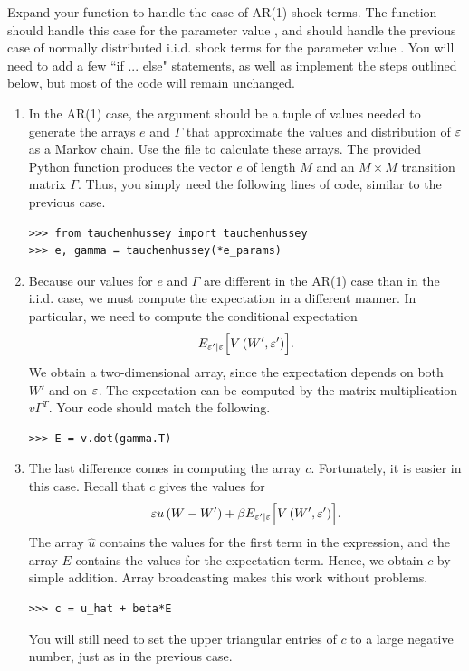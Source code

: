 \begin{problem}
Expand your  function to handle the case of AR(1) shock terms. The function should
handle this case for the parameter value , and should handle the previous case of
normally distributed i.i.d. shock terms for the parameter value . You will need to
add a few ``if ... else" statements, as well as implement the steps outlined below, but most of the
code will remain unchanged.

\begin{enumerate}
\item In the AR(1) case, the  argument should be a tuple of values needed to
generate the arrays $e$ and $\Gamma$ that approximate the values and distribution of $\varepsilon$
as a Markov chain.
Use the file  to calculate these arrays.
The provided Python function  produces the vector $e$ of length $M$
and an $M\times M$ transition matrix $\Gamma$.
Thus, you simply need the following lines of code, similar to the previous case.
\begin{lstlisting}
>>> from tauchenhussey import tauchenhussey
>>> e, gamma = tauchenhussey(*e_params)
\end{lstlisting}

\item Because our values for $e$ and $\Gamma$ are different in the AR(1) case than
in the i.i.d. case, we must compute the expectation in a different manner.
In particular, we need to compute the conditional expectation
\begin{equation*}
E_{\varepsilon'|\varepsilon}\Bigl[V\left(W',\varepsilon'\right)\Bigr].
\end{equation*}
We obtain a two-dimensional array, since the expectation depends on both $W'$ and on $\varepsilon$.
The expectation can be computed by the matrix multiplication $v\Gamma^T$.
Your code should match the following.
\begin{lstlisting}
>>> E = v.dot(gamma.T)
\end{lstlisting}

\item The last difference comes in computing the array $c$. Fortunately, it is easier in this case.
Recall that $c$ gives the values for
\[
\varepsilon u\left(W-W'\right) + \beta E_{\varepsilon'|\varepsilon}\Bigl[V\left(W',\varepsilon'\right)\Bigr].
\]
The array $\hat{u}$ contains the values for the first term in the expression, and the array $E$
contains the values for the expectation term.
Hence, we obtain $c$ by simple addition. Array broadcasting makes this work without problems.
\begin{lstlisting}
>>> c = u_hat + beta*E
\end{lstlisting}
You will still need to set the upper triangular entries of $c$ to a large negative number, just as in the
previous case.
\end{enumerate}


\end{problem}
